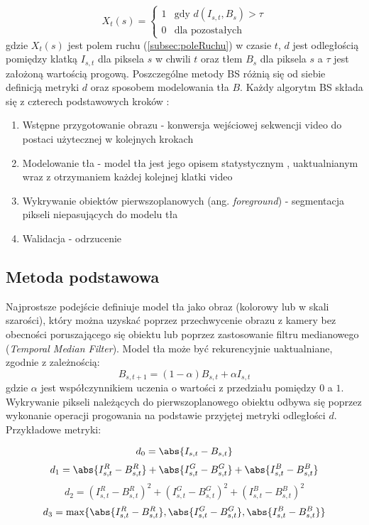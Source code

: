 \begin{equation}
    X_{t}(s) = 
    \begin{cases}
        1 &\mbox{gdy } d(I_{s,t},B_{s})>\tau \\
        0 &\mbox{dla pozostałych}
    \end{cases}
\end{equation}
gdzie $X_{t}(s)$ jest polem ruchu (\ref{subsec:poleRuchu}) w czasie $t$, $d$ jest odległością pomiędzy klatką $I_{s,t}$ dla piksela $s$ w chwili $t$ oraz tłem $B_{s}$ dla piksela $s$ a $\tau$ jest założoną wartością progową. Poszczególne metody BS różnią się od siebie definicją metryki $d$ oraz sposobem modelowania tła $B$. Każdy algorytm BS składa się z czterech podstawowych kroków \cite{Cheung2004}:
\begin{enumerate}
	\item Wstępne przygotowanie obrazu - konwersja wejściowej sekwencji video do postaci użytecznej w kolejnych krokach
	\item Modelowanie tła - model tła jest jego opisem statystycznym , uaktualnianym wraz z otrzymaniem każdej kolejnej klatki video 
	\item Wykrywanie obiektów pierwszoplanowych (ang. \textit{foreground}) - segmentacja pikseli niepasujących do modelu tła
	\item Walidacja - odrzucenie 
\end{enumerate}

\subsection{Metoda podstawowa}
\label{subsec:metodaPodst}
Najprostsze podejście definiuje model tła jako obraz (kolorowy lub w skali szarości), który można uzyskać poprzez przechwycenie obrazu z kamery bez obecności poruszającego się obiektu lub poprzez zastosowanie filtru medianowego (\textit{Temporal Median Filter}). Model tła może być rekurencyjnie uaktualniane, zgodnie z zależnością:
\begin{equation}
	B_{s,t+1} = (1-\alpha)B_{s,t} + \alpha I_{s,t}
\end{equation}
gdzie $\alpha$ jest współczynnikiem uczenia o wartości z przedziału pomiędzy $0$ a $1$. Wykrywanie pikseli należących do pierwszoplanowego obiektu odbywa się poprzez wykonanie operacji progowania na podstawie przyjętej metryki odległości $d$. Przykładowe metryki:

\begin{equation}
	d_0 = \abs{I_{s,t} - B_{s,t}}
\end{equation}  
\begin{equation}
	d_1 = \abs{I_{s,t}^{R} - B_{s,t}^{R}} + \abs{I_{s,t}^{G} - B_{s,t}^{G}} + \abs{I_{s,t}^{B} 		- B_{s,t}^{B}}
\end{equation}
\begin{equation}
	d_2 = (I_{s,t}^{R} - B_{s,t}^{R})^2 + (I_{s,t}^{G} - B_{s,t}^{G})^2 + (I_{s,t}^{B} - 			B_{s,t}^{B})^2
\end{equation}
\begin{equation}
	d_3 = \max\{\abs{I_{s,t}^{R} - B_{s,t}^{R}}, \abs{I_{s,t}^{G} - B_{s,t}^{G}}, \abs{I_{s,t}		^{B} - B_{s,t}^{B}}\}
\end{equation}


